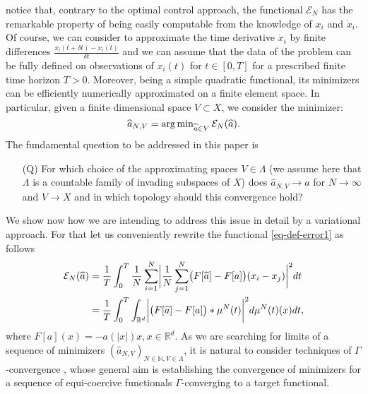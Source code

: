 notice that, contrary to the optimal control approach, the functional $\mathcal E_N$ has the remarkable property of being easily computable from the knowledge of $x_i$ and $\dot{x}_i$. Of course, we can consider to approximate the time derivative $\dot{x}_i$ by finite differences $\frac{x_i(t+\delta t)- x_i(t)}{\delta t}$ and we can assume that the data of the problem can be fully defined on observations of $x_i(t)$ for $t \in [0,T]$ for a prescribed finite time horizon $T>0$. Moreover, being a simple quadratic functional, its minimizers can be efficiently numerically approximated on a finite element space. In particular, given a finite dimensional space $V \subset X$, we consider the minimizer:
\begin{equation}\label{fdproxy}
\widehat a_{N,V} = \operatorname{arg\,min}_{\widehat a \in V} \mathcal E_N(\widehat a).
\end{equation}
The fundamental question to be addressed in this paper is
\begin{itemize}
\item[(Q)] For which choice of the approximating spaces $V \in \Lambda$ (we assume here that $\Lambda$ is a countable family of invading subspaces of $X$) does $\widehat a_{N,V} \to a$ for $N \to \infty$ and $V \to X$ and 
in which topology should this convergence hold?
\end{itemize}
We show now how  we are intending to address this issue in detail by a variational approach.
For that let us conveniently rewrite the functional \eqref{eq-def-error1} as follows
\begin{align}\label{pirlo}
	\begin{split}
	\mathcal E_N(\widehat a) & = \frac{1}{T}\int_0^T\frac{1}{N}\sum_{i=1}^N\biggl|\frac{1}{N}\sum_{j=1}^N
			\bigl(F[\widehat a]-F[a]\bigr)(x_i-x_j)\biggr|^2 dt\\
			& = \frac{1}{T}\int_0^T \int_{\mathbb{R}^d} \biggl|\bigl(F[\widehat a]-F[a]\bigr)\ast\mu^N(t)\biggr|^2d\mu^N(t)(x)dt,
	\end{split}
\end{align}
where $F[a](x) =-a(| x |)x, x \in \mathbb R^{d}$.  As we are searching for limits of a sequence of minimizers $(\widehat a_{N,V})_{N \in \mathbb N, V \in \Lambda}$, it is natural to consider  techniques of $\Gamma$-convergence \cite{MR1201152}, whose general aim is establishing the convergence of minimizers for a sequence of equi-coercive functionals $\Gamma$-converging to a target functional.


